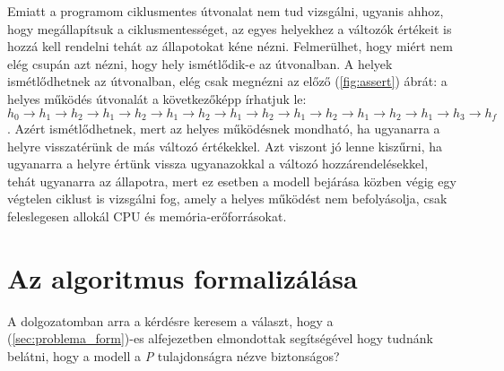 Emiatt a programom ciklusmentes útvonalat nem tud vizsgálni, ugyanis ahhoz, hogy megállapítsuk a ciklusmentességet, az egyes helyekhez a változók értékeit is hozzá kell rendelni tehát az állapotokat kéne nézni. Felmerülhet, hogy miért nem elég csupán azt nézni, hogy hely ismétlődik-e az útvonalban. A helyek ismétlődhetnek az útvonalban, elég csak megnézni az előző (\ref{fig:assert}) ábrát: a helyes működés útvonalát a következőképp írhatjuk le: $ h_0 \rightarrow h_1 \rightarrow h_2 \rightarrow h_1 \rightarrow h_2 \rightarrow h_1 \rightarrow h_2 \rightarrow h_1 \rightarrow h_2 \rightarrow h_1 \rightarrow h_2 \rightarrow h_1 \rightarrow h_2 \rightarrow h_1 \rightarrow h_3 \rightarrow h_f $. Azért ismétlődhetnek, mert az helyes működésnek mondható, ha ugyanarra a helyre visszatérünk de más változó értékekkel. Azt viszont jó lenne kiszűrni, ha ugyanarra a helyre értünk vissza ugyanazokkal a változó hozzárendelésekkel, tehát ugyanarra az állapotra, mert ez esetben a modell bejárása közben végig egy végtelen ciklust is vizsgálni fog, amely a helyes működést nem befolyásolja, csak feleslegesen allokál CPU és memória-erőforrásokat.

\section{Az algoritmus formalizálása}
\label{sec:formalizalt_alg}

A dolgozatomban arra a kérdésre keresem a választ, hogy a (\ref{sec:problema_form})-es alfejezetben elmondottak segítségével hogy tudnánk belátni, hogy a modell a \emph{P} tulajdonságra nézve biztonságos?

